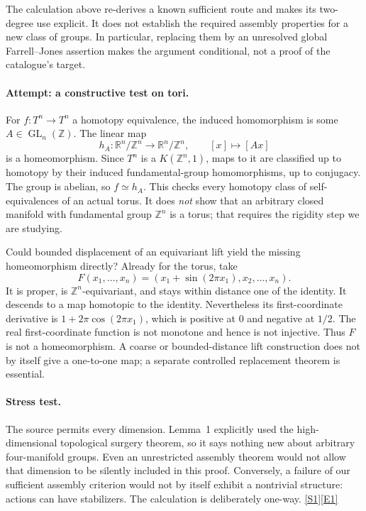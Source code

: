\documentclass[11pt,a4paper]{article}
\newcommand{\Z}{\mathbb{Z}}
\newcommand{\R}{\mathbb{R}}
\newcommand{\sref}[2]{\hyperlink{source:#1:#2}{[S#2]}}
\newcommand{\eref}[2]{\hyperlink{extra:#1:#2}{[E#2]}}
\numberwithin{equation}{section}
\begin{document}
The calculation above re-derives a known sufficient route and makes its
two-degree use explicit. It does not establish the required assembly
properties for a new class of groups. In particular, replacing them by
an unresolved global Farrell--Jones assertion makes the argument
conditional, not a proof of the catalogue's target.

\paragraph{Attempt: a constructive test on tori.}
For $f:T^n\to T^n$ a homotopy equivalence, the induced homomorphism is
some $A\in\operatorname{GL}_n(\Z)$. The linear map
\[
 h_A:\R^n/\Z^n\longrightarrow\R^n/\Z^n,
 \qquad [x]\longmapsto[Ax]
\]
is a homeomorphism. Since $T^n$ is a $K(\Z^n,1)$, maps to it are
classified up to homotopy by their induced fundamental-group homomorphisms,
up to conjugacy. The group is abelian, so $f\simeq h_A$.
This checks every homotopy class of self-equivalences of an actual torus.
It does \emph{not} show that an arbitrary closed manifold with fundamental
group $\Z^n$ is a torus; that requires the rigidity step we are studying.

Could bounded displacement of an equivariant lift yield the missing
homeomorphism directly? Already for the torus, take
\[
 F(x_1,\ldots,x_n)=
 (x_1+\sin(2\pi x_1),x_2,\ldots,x_n).
\]
It is proper, is $\Z^n$-equivariant, and stays within distance one of the
identity. It descends to a map homotopic to the identity. Nevertheless its
first-coordinate derivative is $1+2\pi\cos(2\pi x_1)$, which is positive
at $0$ and negative at $1/2$. The real first-coordinate function is not
monotone and hence is not injective. Thus $F$ is not a homeomorphism.
A coarse or bounded-distance lift construction does not by itself give
a one-to-one map; a separate controlled replacement theorem is essential.

\paragraph{Stress test.}
The source permits every dimension. Lemma~1 explicitly used the
high-dimensional topological surgery theorem, so it says nothing new about
arbitrary four-manifold groups. Even an unrestricted assembly theorem
would not allow that dimension to be silently included in this proof.
Conversely, a failure of our sufficient assembly criterion would not by
itself exhibit a nontrivial structure: actions can have stabilizers.
The calculation is deliberately one-way. \sref{115}{1}\eref{115}{1}
\end{document}
